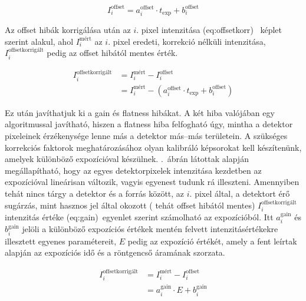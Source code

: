 \documentclass[a4paper,12pt,twoside]{article}
\begin{document}
\begin{equation}
\label{eq:offset}
I_i^{\text{offset}} =  a_i^{\text{offset}} \cdot t_{\text{exp}} + b_i^{\text{offset}}
\end{equation}

Az offset hibák korrigálása után  az $i$. pixel intenzitása \aref({eq:offsetkorr})~ képlet szerint alakul, ahol $I_i^{\text{mért}}$ az $i.$ pixel eredeti, korrekció nélküli intenzitása, $I_i^{\text{offsetkorrigált}}$ pedig az offset hibától mentes érték.

\begin{equation}
\label{eq:offsetkorr}
\begin{split}
I_i^{\text{offsetkorrigált}}  &=  I_i^{\text{mért}} - I_i^{\text{offset}} \\&=  I_i^{\text{mért}} - \left( a_i^{\text{offset}} \cdot t_{\text{exp}} + b_i^{\text{offset}} \right)
\end{split}
\end{equation}


Ez után javíthatjuk ki a gain és flatness hibákat. A két hiba valójában egy algoritmussal javítható, hiszen a flatness hiba felfogható úgy, mintha a detektor pixeleinek érzékenysége lenne más a detektor más--más területein. A szükséges korrekciós faktorok meghatározásához olyan kalibráló képsorokat kell készítenünk, amelyek különböző expozícióval készülnek. .~ábrán látottak alapján megállapítható, hogy az egyes detektorpixelek intenzitása kezdetben az expozícióval lineárisan változik, vagyis egyenest tudunk rá illeszteni. Amennyiben tehát nincs tárgy a detektor és a forrás között, az $i$. pixel által, a detektort érő sugárzás, mint hasznos jel által okozott ( tehát offset hibától mentes) $ I_i^{\text{offsetkorrigált}}$  intenzitás értéke \aref({eq:gain})~egyenlet szerint számolható az expozícióból. Itt $a_i^{\text{gain}}  $ és $b_i^{\text{gain}}$ jelöli a különböző expozíciós értékek mentén felvett intenzitásértékekre illesztett egyenes paramétereit, $E$ pedig az expozíció értékét, amely a fent leírtak alapján az expozíciós idő és a röntgencső áramának szorzata.

\begin{equation}
\label{eq:gain}
\begin{split}
I_i^{\text{offsetkorrigált}}  &=  I_i^{\text{mért}} - I_i^{\text{offset}} \\&=  a_i^{\text{gain}} \cdot E + b_i^{\text{gain}}
\end{split}
\end{equation}
\end{document}
